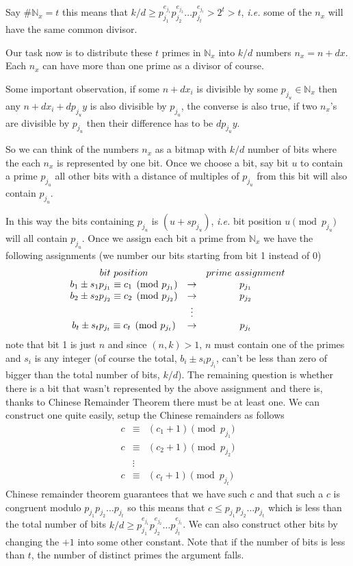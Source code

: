 \documentclass[aps,preprint,preprintnumbers,nofootinbib,showpacs,prd]{revtex4-1}
\newcommand{\ie}{{\it i.e.} }
\newcommand{\nbea}{\begin{eqnarray*}}
\newcommand{\neea}{\end{eqnarray*}}
\begin{document}
Say $\#\mathbb{N}_x = t$ this means that $k/d \ge p_{j_1}^{e_{j_1}} p_{j_2}^{e_{j_2}} \dots p_{j_t}^{e_{j_t}} > 2^t > t$, \ie some of the $n_x$ will have the same common divisor.

Our task now is to distribute these $t$ primes in $\mathbb{N}_x$ into $k/d$ numbers $n_x = n + dx$. Each $n_x$ can have more than one prime as a divisor of course.

Some important observation, if some $n + dx_i$ is divisible by some $p_{j_u} \in \mathbb{N}_x$ then any $n + dx_i + dp_{j_u}y$ is also divisible by $p_{j_u}$, the converse is also true, if two $n_x$'s are divisible by $p_{j_u}$ then their difference has to be $dp_{j_u}y$.

So we can think of the numbers $n_x$ as a bitmap with $k/d$ number of bits where the each $n_x$ is represented by one bit. Once we choose a bit, say bit $u$ to contain a prime $p_{j_u}$ all other bits with a distance of multiples of $p_{j_u}$ from this bit will also contain $p_{j_u}$.

In this way the bits containing $p_{j_u}$ is $(u + sp_{j_u})$, \ie bit position $u \pmod{p_{j_u}}$ will all contain $p_{j_u}$. Once we assign each bit a prime from $\mathbb{N}_x$ we have the following assignments (we number our bits starting from bit 1 instead of 0)
%
\nbea
\begin{array}{c c c}
bit~position & & prime~assignment\\
b_1 \pm s_1 p_{j_1} \equiv c_1 \pmod{p_{j_1}} & \to & p_{j_1} \\
b_2 \pm s_2 p_{j_2} \equiv c_2 \pmod{p_{j_2}} & \to & p_{j_2} \\
& \vdots & \\
b_t \pm s_{t} p_{j_{t}} \equiv c_t \pmod{p_{j_t}} & \to & p_{j_{t}}
\end{array}
\neea
%
note that bit 1 is just $n$ and since $(n,k) > 1$, $n$ must contain one of the primes and $s_i$ is any integer (of course the total, $b_i \pm s_i p_{j_i}$, can't be less than zero of bigger than the total number of bits, $k/d$). The remaining question is whether there is a bit that wasn't represented by the above assignment and there is, thanks to Chinese Remainder Theorem there must be at least one. We can construct one quite easily, setup the Chinese remainders as follows
%
\nbea
c & \equiv & (c_1 + 1) \pmod{p_{j_1}} \\
c & \equiv & (c_2 + 1) \pmod{p_{j_2}} \\
& \vdots & \\
c & \equiv & (c_t + 1) \pmod{p_{j_t}}
\neea
%
Chinese remainder theorem guarantees that we have such $c$ and that such a $c$ is congruent modulo $p_{j_1} p_{j_2} \dots p_{j_t}$ so this means that $c \le p_{j_1} p_{j_2} \dots p_{j_t}$ which is less than the total number of bits $k/d \ge p_{j_1}^{e_{j_1}} p_{j_2}^{e_{j_2}} \dots p_{j_t}^{e_{j_t}}$. We can also construct other bits by changing the $ + 1$ into some other constant. Note that if the number of bits is less than $t$, the number of distinct primes the argument falls.
\end{document}
